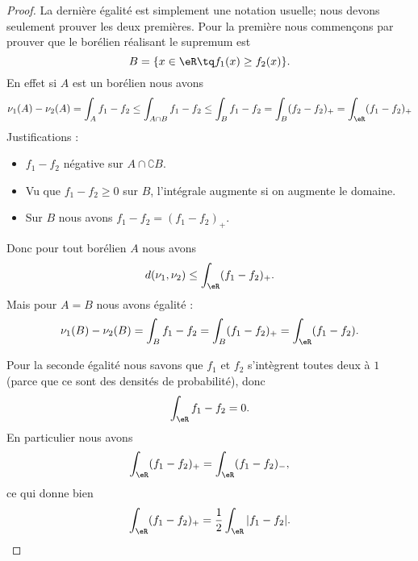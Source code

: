 \begin{proof}
    La dernière égalité est simplement une notation usuelle; nous devons seulement prouver les deux premières. Pour la première nous commençons par prouver que le borélien réalisant le supremum est
    \begin{equation}
        B=\{ x\in\eR\tq f_1(x)\geq f_2(x) \}.
    \end{equation}
    En effet si \( A\) est un borélien nous avons
    \begin{equation}
        \nu_1(A)-\nu_2(A)=\int_Af_1-f_2
        \leq\int_{A\cap B}f_1-f_2
        \leq\int_Bf_1-f_2
        =\int_B(f_2-f_2)_+
        =\int_{\eR}(f_1-f_2)_+
    \end{equation}
    Justifications :
    \begin{itemize}
        \item  \( f_1-f_2\) négative sur \( A\cap \complement B\).
        \item Vu que \( f_1-f_2\geq0\) sur \( B\), l'intégrale augmente si on augmente le domaine.
        \item Sur \( B\) nous avons \( f_1-f_2=(f_1-f_2)_+\).
    \end{itemize}
    Donc pour tout borélien \( A\) nous avons
    \begin{equation}
        d(\nu_1,\nu_2)\leq \int_{\eR}(f_1-f_2)_+.
    \end{equation}
    Mais pour \( A=B\) nous avons égalité :
    \begin{equation}
        \nu_1(B)-\nu_2(B)=\int_{B}f_1-f_2=\int_B(f_1-f_2)_+=\int_{\eR}(f_1-f_2).
    \end{equation}
    
    Pour la seconde égalité nous savons que \( f_1\) et \( f_2\) s'intègrent toutes deux à \( 1\) (parce que ce sont des densités de probabilité), donc
    \begin{equation}
        \int_{\eR}f_1-f_2=0.
    \end{equation}
    En particulier nous avons
    \begin{equation}
        \int_{\eR}(f_1-f_2)_+=\int_{\eR}(f_1-f_2)_-,
    \end{equation}
    ce qui donne bien
    \begin{equation}
        \int_{\eR}(f_1-f_2)_+=\frac{ 1 }{2}\int_{\eR}|f_1-f_2|.
    \end{equation}
\end{proof}


